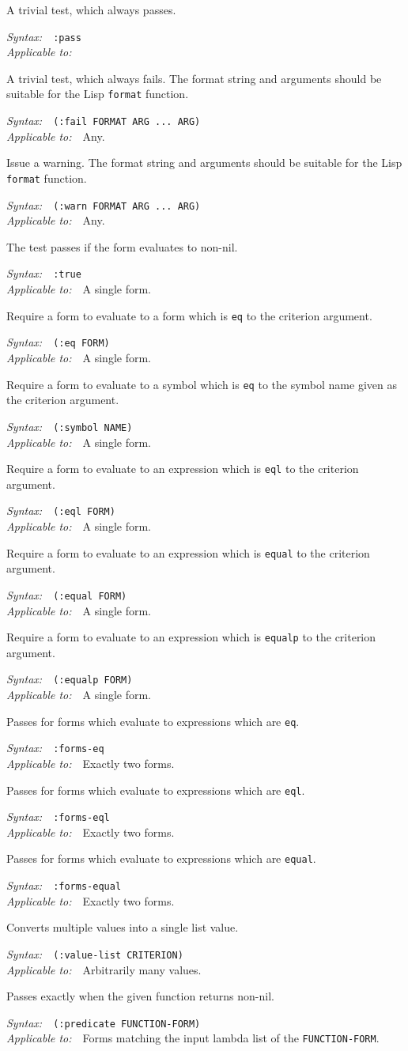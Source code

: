 \documentclass{article}
\newenvironment{criteria}%
{\begin{list}{}
    {\setlength{\labelwidth}{0pt}
     \setlength{\leftmargin}{2em}
     \setlength{\rightmargin}{1em}
     \setlength{\itemindent}{0em}}}%
  {\end{list}}
\def\criterion#1#2#3#4{\item[\bfseries #1] #4\par
  \emph{Syntax:}~~\texttt{#2}\\ \emph{Applicable to:}~~#3}
\begin{document}
\begin{criteria}
  \criterion{:pass}{:pass}{}{A trivial test, which always passes.}

  \criterion{:fail}{(:fail FORMAT ARG ...\ ARG)}{Any.}{A trivial test,
    which always fails.  The format string and arguments should be
    suitable for the Lisp \texttt{format} function.}

  \criterion{:warn}{(:warn FORMAT ARG ...\ ARG)}{Any.}{Issue a warning.
    The format string and arguments should be suitable for the Lisp
    \texttt{format} function.}

  \criterion{:true}{:true}{A single form.}{The test passes if the
    form evaluates to non-nil.}

  \criterion{:eq}{(:eq FORM)}{A single form.}{Require a form to
    evaluate to a form which is \texttt{eq} to the criterion argument.}

  \criterion{:symbol}{(:symbol NAME)}{A single form.}{Require a form
    to evaluate to a symbol which is \texttt{eq} to the symbol name
    given as the criterion argument.}

  \criterion{:eql}{(:eql FORM)}{A single form.}{Require a form to
    evaluate to an expression which is \texttt{eql} to the criterion
    argument.}

  \criterion{:equal}{(:equal FORM)}{A single form.}{Require a form to
    evaluate to an expression which is \texttt{equal} to the criterion
    argument.}

  \criterion{:equalp}{(:equalp FORM)}{A single form.}{Require a form
    to evaluate to an expression which is \texttt{equalp} to the
    criterion argument.}

  \criterion{:forms-eq}{:forms-eq}{Exactly two forms.}{Passes for
    forms which evaluate to expressions which are \texttt{eq}.}

  \criterion{:forms-eql}{:forms-eql}{Exactly two forms.}{Passes for
    forms which evaluate to expressions which are \texttt{eql}.}

  \criterion{:forms-equal}{:forms-equal}{Exactly two forms.}{Passes
    for forms which evaluate to expressions which are \texttt{equal}.}

  \criterion{:value-list}
  {(:value-list CRITERION)}
  {Arbitrarily many values.}
  {Converts multiple values into a single list value.}

  \criterion{:predicate}{(:predicate FUNCTION-FORM)}
  {Forms matching the input lambda list of the \texttt{FUNCTION-FORM}.}
  {Passes exactly when the given function returns non-nil.}


\end{criteria}
\end{document}
